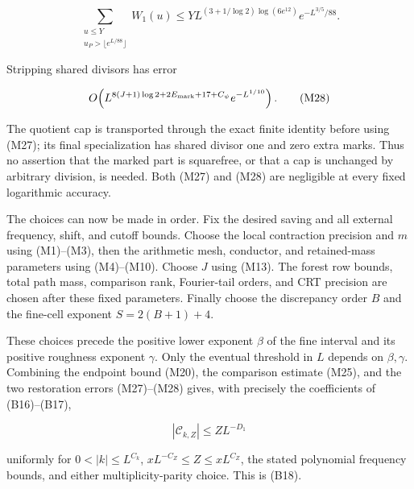 \[
\sum_{\substack{u\le Y\\u_P>\lfloor e^{L/88}\rfloor}}W_1(u)
 \le YL^{(3+1/\log2)\log(6e^{12})}e^{-L^{3/5}/88}. \tag{M27}
\]

Stripping shared divisors has error

\[
O\!\left(L^{8(J+1)\log2+2E_{\rm mark}+17+C_\psi}
                e^{-L^{1/10}}\right). \tag{M28}
\]

The quotient cap is transported through the exact finite identity before
using (M27); its final specialization has shared divisor one and zero
extra marks. Thus no assertion that the marked part is squarefree, or
that a cap is unchanged by arbitrary division, is needed. Both (M27) and
(M28) are negligible at every fixed logarithmic accuracy.

The choices can now be made in order. Fix the desired saving and all
external frequency, shift, and cutoff bounds. Choose the local
contraction precision and \(m\) using (M1)--(M3), then the arithmetic
mesh, conductor, and retained-mass parameters using (M4)--(M10). Choose
\(J\) using (M13). The forest row bounds, total path mass, comparison
rank, Fourier-tail orders, and CRT precision are chosen after these
fixed parameters. Finally choose the discrepancy order \(B\) and the
fine-cell exponent \(S=2(B+1)+4\).

These choices precede the positive lower exponent \(\beta\) of the fine
interval and its positive roughness exponent \(\gamma\). Only the
eventual threshold in \(L\) depends on \(\beta,\gamma\). Combining the
endpoint bound (M20), the comparison estimate (M25), and the two
restoration errors (M27)--(M28) gives, with precisely the coefficients
of (B16)--(B17),

\[
|\mathcal C_{k,Z}|\le ZL^{-D_1}
\]

uniformly for \(0<|k|\le L^{C_k}\), \(xL^{-C_Z}\le Z\le xL^{C_Z}\), the
stated polynomial frequency bounds, and either multiplicity-parity
choice. This is (B18).
